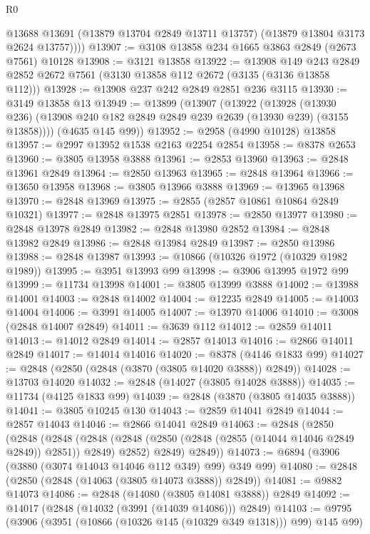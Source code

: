 \begin{lexlean}{R0}
\begin{coremodule}
          @13688
          @13691
          (@13879 @13704 @2849 @13711 @13757)
          (@13879 @13804 @3173 @2624 @13757))))
@13907 := @3108 @13858 @234 @1665 @3863 @2849 (@2673 @7561) @10128
@13908 := @3121 @13858
@13922 := @13908
    @149
    @243
    @2849
    @2852
    @2672
    @7561
    (@3130 @13858 @112 @2672 (@3135 (@3136 @13858 @112)))
@13928 := @13908 @237 @242 @2849 @2851 @236 @3115
@13930 := @3149 @13858 @13
@13949 := @13899
    (@13907
      (@13922
        (@13928
          (@13930 @236)
          (@13908 @240 @182 @2849 @2849 @239 @2639 (@13930 @239) (@3155 @13858))))
      (@4635 @145 @99))
@13952 := @2958 (@4990 @10128) @13858
@13957 := @2997 @13952 @1538 @2163 @2254 @2854
@13958 := @8378 @2653
@13960 := @3805 @13958 @3888
@13961 := @2853 @13960
@13963 := @2848 @13961 @2849
@13964 := @2850 @13963
@13965 := @2848 @13964
@13966 := @13650 @13958
@13968 := @3805 @13966 @3888
@13969 := @13965 @13968
@13970 := @2848 @13969
@13975 := @2855 (@2857 @10861 @10864 @2849 @10321)
@13977 := @2848 @13975 @2851
@13978 := @2850 @13977
@13980 := @2848 @13978 @2849
@13982 := @2848 @13980 @2852
@13984 := @2848 @13982 @2849
@13986 := @2848 @13984 @2849
@13987 := @2850 @13986
@13988 := @2848 @13987
@13993 := @10866 (@10326 @1972 (@10329 @1982 @1989))
@13995 := @3951 @13993 @99
@13998 := @3906 @13995 @1972 @99
@13999 := @11734 @13998
@14001 := @3805 @13999 @3888
@14002 := @13988 @14001
@14003 := @2848 @14002
@14004 := @12235 @2849
@14005 := @14003 @14004
@14006 := @3991 @14005
@14007 := @13970 @14006
@14010 := @3008 (@2848 @14007 @2849)
@14011 := @3639 @112
@14012 := @2859 @14011
@14013 := @14012 @2849
@14014 := @2857 @14013
@14016 := @2866 @14011 @2849
@14017 := @14014 @14016
@14020 := @8378 (@4146 @1833 @99)
@14027 := @2848 (@2850 (@2848 (@3870 (@3805 @14020 @3888)) @2849))
@14028 := @13703 @14020
@14032 := @2848 (@14027 (@3805 @14028 @3888))
@14035 := @11734 (@4125 @1833 @99)
@14039 := @2848 (@3870 (@3805 @14035 @3888))
@14041 := @3805 @10245 @130
@14043 := @2859 @14041 @2849
@14044 := @2857 @14043
@14046 := @2866 @14041 @2849
@14063 := @2848
    (@2850
      (@2848
        (@2848
          (@2848 (@2848 (@2850 (@2848 (@2855 (@14044 @14046 @2849 @2849)) @2851)) @2849) @2852)
          @2849)
        @2849))
@14073 := @6894 (@3906 (@3880 (@3074 @14043 @14046 @112 @349) @99) @349 @99)
@14080 := @2848 (@2850 (@2848 (@14063 (@3805 @14073 @3888)) @2849))
@14081 := @9882 @14073
@14086 := @2848 (@14080 (@3805 @14081 @3888)) @2849
@14092 := @14017 (@2848 (@14032 (@3991 (@14039 @14086))) @2849)
@14103 := @9795 (@3906 (@3951 (@10866 (@10326 @145 (@10329 @349 @1318))) @99) @145 @99)

\end{coremodule}
\end{lexlean}
